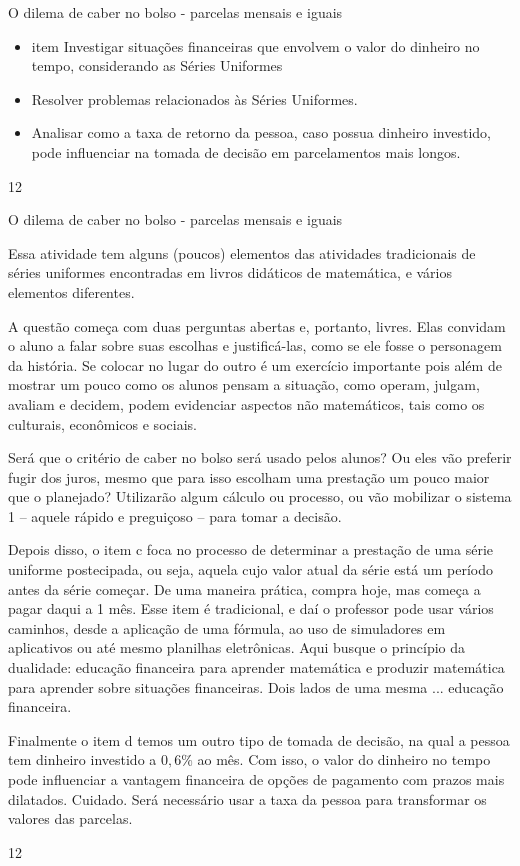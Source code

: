 \clearpage
\clearmargin
\clearmargin
\begin{objectives}{O dilema de caber no bolso - parcelas mensais e iguais}
{
\begin{itemize}
\item item Investigar situações financeiras que envolvem o valor do dinheiro no tempo, considerando as Séries Uniformes
\item Resolver problemas relacionados às Séries Uniformes.
\item Analisar como a taxa de retorno da pessoa, caso possua dinheiro investido, pode influenciar na tomada de decisão em parcelamentos mais longos.
\end{itemize}
}{1}{2}
\end{objectives}
\marginpar{\vspace{-2.5em}}
\begin{sugestions}{O dilema de caber no bolso - parcelas mensais e iguais}
{
Essa atividade tem alguns (poucos) elementos das atividades tradicionais de séries uniformes encontradas em livros didáticos de matemática, e vários elementos diferentes. 

A questão começa com duas perguntas abertas e, portanto, livres. Elas convidam o aluno a falar sobre suas escolhas e justificá-las, como se ele fosse o personagem da história. Se colocar no lugar do outro é um exercício importante pois além de mostrar um pouco como os alunos pensam a situação, como operam, julgam, avaliam e decidem, podem evidenciar aspectos não matemáticos, tais como os culturais, econômicos e sociais.

Será que o critério de caber no bolso será usado pelos alunos? Ou eles vão preferir fugir dos juros, mesmo que para isso escolham uma prestação um pouco maior que o planejado? Utilizarão algum cálculo ou processo, ou vão mobilizar o sistema 1 – aquele rápido e preguiçoso – para tomar a decisão.

Depois disso, o item c foca no processo de determinar a prestação de uma série uniforme postecipada, ou seja, aquela cujo valor atual da série está um período antes da série começar. De uma maneira prática, compra hoje, mas começa a pagar daqui a 1 mês. Esse item é tradicional, e daí o professor pode usar vários caminhos, desde a aplicação de uma fórmula, ao uso de simuladores em aplicativos ou até mesmo planilhas eletrônicas. Aqui busque o princípio da dualidade: educação financeira para aprender matemática e produzir matemática para aprender sobre situações financeiras. Dois lados de uma mesma ... educação financeira. 

Finalmente o item d temos um outro tipo de tomada de decisão, na qual a pessoa tem dinheiro investido a $0{,}6\%$ ao mês. Com isso, o valor do dinheiro no tempo pode influenciar a vantagem financeira de opções de pagamento com prazos mais dilatados. Cuidado. Será necessário usar a taxa da pessoa para transformar os valores das parcelas. 

}{1}{2}
\end{sugestions}

